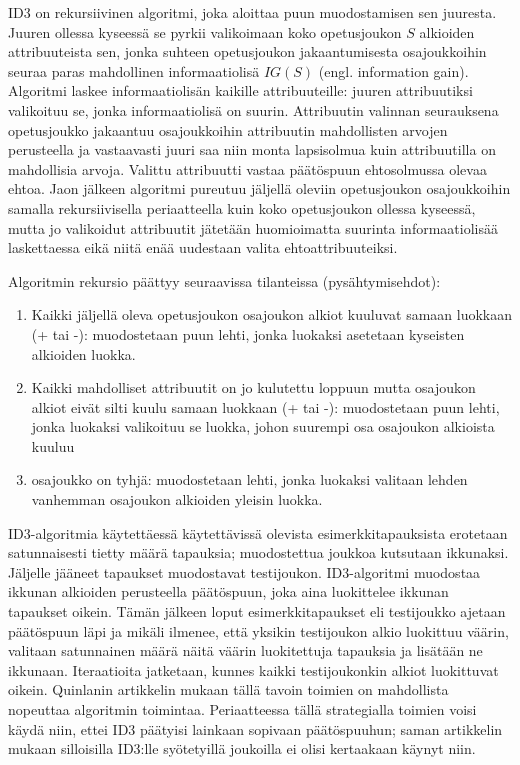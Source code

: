\documentclass[12pt,finnish]{tktltiki2}
\theoremstyle{definition}
\theoremstyle{remark}
\begin{document}
ID3 on rekursiivinen algoritmi, joka aloittaa puun muodostamisen sen juuresta. Juuren ollessa kyseessä se pyrkii
valikoimaan koko opetusjoukon $S$ alkioiden attribuuteista sen, jonka suhteen opetusjoukon jakaantumisesta
osajoukkoihin seuraa paras mahdollinen informaatiolisä $IG(S)$ (engl. information gain). Algoritmi laskee
informaatiolisän kaikille attribuuteille: juuren attribuutiksi valikoituu se, jonka informaatiolisä
on suurin. Attribuutin valinnan seurauksena opetusjoukko jakaantuu osajoukkoihin attribuutin mahdollisten arvojen
perusteella ja vastaavasti juuri saa niin monta lapsisolmua kuin attribuutilla on mahdollisia arvoja. Valittu
attribuutti vastaa päätöspuun ehtosolmussa olevaa ehtoa. Jaon jälkeen algoritmi pureutuu jäljellä oleviin
opetusjoukon osajoukkoihin samalla rekursiivisella periaatteella kuin koko opetusjoukon ollessa kyseessä, mutta jo valikoidut
attribuutit jätetään huomioimatta suurinta informaatiolisää laskettaessa eikä niitä enää uudestaan valita
ehtoattribuuteiksi.

Algoritmin rekursio päättyy seuraavissa tilanteissa (pysähtymisehdot): 
\begin{enumerate}
  \item Kaikki jäljellä oleva opetusjoukon osajoukon alkiot kuuluvat samaan luokkaan (+ tai -): muodostetaan puun lehti, jonka luokaksi
  asetetaan kyseisten alkioiden luokka.
  \item Kaikki mahdolliset attribuutit on jo kulutettu loppuun mutta osajoukon alkiot eivät silti kuulu samaan luokkaan (+ tai -): muodostetaan puun lehti,
  jonka luokaksi valikoituu se luokka, johon suurempi osa osajoukon alkioista kuuluu
  \item osajoukko on tyhjä: muodostetaan lehti, jonka luokaksi valitaan lehden vanhemman osajoukon alkioiden yleisin luokka.
\end{enumerate}

ID3-algoritmia käytettäessä käytettävissä olevista esimerkkitapauksista erotetaan satunnaisesti tietty määrä tapauksia; muodostettua
joukkoa kutsutaan ikkunaksi. Jäljelle jääneet tapaukset muodostavat testijoukon. ID3-algoritmi muodostaa ikkunan alkioiden
perusteella päätöspuun, joka aina luokittelee ikkunan tapaukset oikein. Tämän jälkeen loput esimerkkitapaukset eli testijoukko ajetaan
päätöspuun läpi ja mikäli ilmenee, että yksikin testijoukon alkio luokittuu väärin, valitaan satunnainen määrä näitä väärin
luokitettuja tapauksia ja lisätään ne ikkunaan. Iteraatioita jatketaan, kunnes kaikki testijoukonkin alkiot luokittuvat oikein.
Quinlanin artikkelin mukaan \cite{quinlan} tällä tavoin toimien on mahdollista nopeuttaa algoritmin toimintaa. Periaatteessa tällä
strategialla toimien voisi käydä niin, ettei ID3 päätyisi lainkaan sopivaan päätöspuuhun; saman artikkelin
mukaan silloisilla ID3:lle syötetyillä joukoilla ei olisi kertaakaan käynyt niin.
\end{document}
